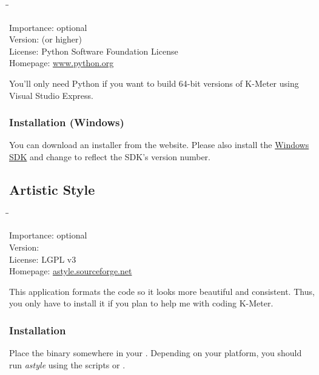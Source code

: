 \begin{tabbing}
  \hspace*{6em}\=\=\kill

  Importance:  \> optional \\
  Version:      (or higher) \\
  License:     \> Python Software Foundation License \\
  Homepage:    \> \href{http://www.python.org/}{www.python.org}
\end{tabbing}

You'll only need Python if you want to build \num{64}-bit versions of
K-Meter using Visual Studio Express.

\subsubsection{Installation (Windows)}

You can download an installer from the website.  Please also install
the \href{http://msdn.microsoft.com/windows/bb980924.aspx}{Windows
  SDK} and change  to reflect the SDK's version
number.

\subsection{Artistic Style}

\begin{tabbing}
  \hspace*{6em}\=\=\kill

  Importance:  \> optional \\
  Version:      \\
  License:     \> LGPL v3 \\
  Homepage:    \> \href{http://astyle.sourceforge.net/}{astyle.sourceforge.net}
\end{tabbing}

This application formats the code so it looks more beautiful and
consistent.  Thus, you only have to install it if you plan to help me
with coding K-Meter.

\subsubsection{Installation}

Place the binary somewhere in your .  Depending on your
platform, you should run \emph{astyle} using the scripts
 or .

